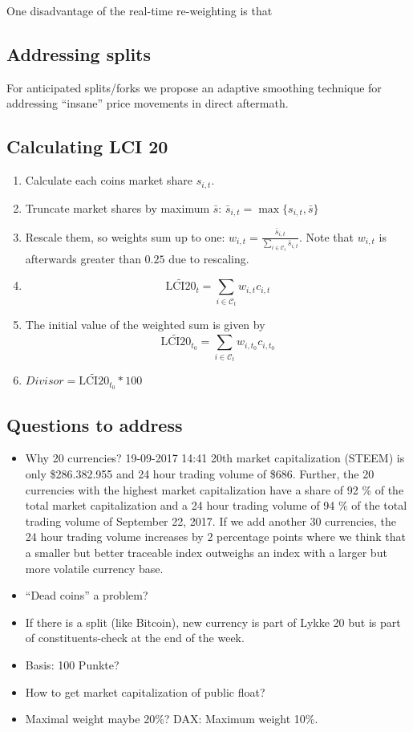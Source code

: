 \documentclass[11pt]{article}
\begin{document}
One disadvantage of the real-time re-weighting is that

\subsection{Addressing splits}\label{subseq:split_smoothing}
For anticipated splits/forks we propose an adaptive smoothing technique for addressing ``insane'' price movements in direct aftermath.

\subsection{Calculating LCI 20}

\begin{enumerate}
  \item Calculate each coins market share $s_{i,t}$.
  \item Truncate market shares by maximum $\bar s$: $\bar s_{i,t} = \max\{ s_{i,t}, \bar s\}$
  \item Rescale them, so weights sum up to one: $w_{i,t} = \frac{\bar s_{i,t}}{\sum_{i \in \mathcal{C}_t} \bar s_{i,t}}$. Note that $w_{i,t}$ is afterwards greater than $0.25$ due to rescaling.
  \item $$\widetilde{\text{LCI20}}_t = \sum_{i \in \mathcal{C}_{t}} w_{i,t} c_{i,t}$$
  \item The initial value of the weighted sum is given by $$\widetilde{\text{LCI20}}_{t_0} = \sum_{i \in \mathcal{C}_{t}} w_{i,t_0} c_{i,t_0}$$
  \item $Divisor = \widetilde{\text{LCI20}}_{t_0} * 100$
\end{enumerate}

\subsection{Questions to address}
\begin{itemize}
  \item Why 20 currencies? 19-09-2017 14:41 20th market capitalization (STEEM) is only \$286.382.955 and 24 hour trading volume of \$686. Further, the 20 currencies with the highest market capitalization have a share of 92 \% of the total market capitalization and a 24 hour trading volume of 94 \% of the total trading volume of September 22, 2017. If we add another 30 currencies, the 24 hour trading volume increases by 2 percentage points where we think that a smaller but better traceable index outweighs an index with a larger but more volatile currency base.
  \item ``Dead coins'' a problem?
  \item If there is a split (like Bitcoin), new currency is part of Lykke 20 but is part of constituents-check at the end of the week.
  \item Basis: 100 Punkte?
  \item How to get market capitalization of public float?
  \item Maximal weight maybe 20\%? DAX: Maximum weight 10\%.
\end{itemize}
\end{document}
